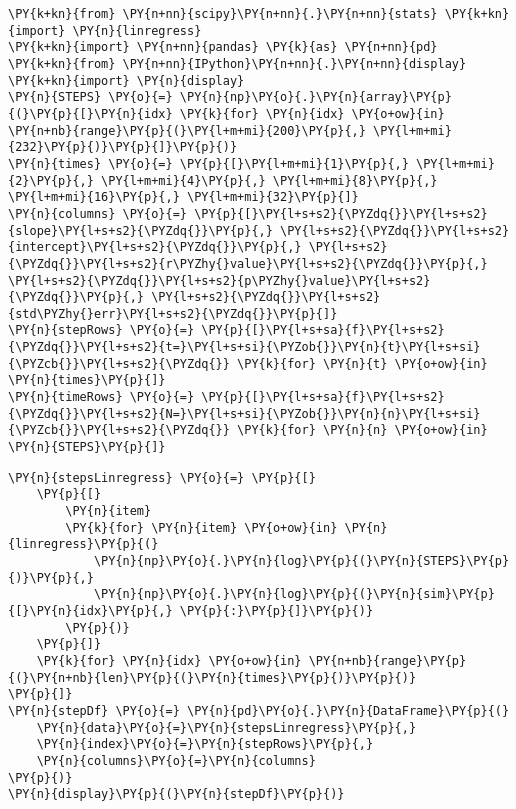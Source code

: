     \begin{tcolorbox}[breakable, size=fbox, boxrule=1pt, pad at break*=1mm,colback=cellbackground, colframe=cellborder]
\begin{Verbatim}[commandchars=\\\{\}]
\PY{k+kn}{from} \PY{n+nn}{scipy}\PY{n+nn}{.}\PY{n+nn}{stats} \PY{k+kn}{import} \PY{n}{linregress}
\PY{k+kn}{import} \PY{n+nn}{pandas} \PY{k}{as} \PY{n+nn}{pd}
\PY{k+kn}{from} \PY{n+nn}{IPython}\PY{n+nn}{.}\PY{n+nn}{display} \PY{k+kn}{import} \PY{n}{display}
\PY{n}{STEPS} \PY{o}{=} \PY{n}{np}\PY{o}{.}\PY{n}{array}\PY{p}{(}\PY{p}{[}\PY{n}{idx} \PY{k}{for} \PY{n}{idx} \PY{o+ow}{in} \PY{n+nb}{range}\PY{p}{(}\PY{l+m+mi}{200}\PY{p}{,} \PY{l+m+mi}{232}\PY{p}{)}\PY{p}{]}\PY{p}{)}
\PY{n}{times} \PY{o}{=} \PY{p}{[}\PY{l+m+mi}{1}\PY{p}{,} \PY{l+m+mi}{2}\PY{p}{,} \PY{l+m+mi}{4}\PY{p}{,} \PY{l+m+mi}{8}\PY{p}{,} \PY{l+m+mi}{16}\PY{p}{,} \PY{l+m+mi}{32}\PY{p}{]}
\PY{n}{columns} \PY{o}{=} \PY{p}{[}\PY{l+s+s2}{\PYZdq{}}\PY{l+s+s2}{slope}\PY{l+s+s2}{\PYZdq{}}\PY{p}{,} \PY{l+s+s2}{\PYZdq{}}\PY{l+s+s2}{intercept}\PY{l+s+s2}{\PYZdq{}}\PY{p}{,} \PY{l+s+s2}{\PYZdq{}}\PY{l+s+s2}{r\PYZhy{}value}\PY{l+s+s2}{\PYZdq{}}\PY{p}{,} \PY{l+s+s2}{\PYZdq{}}\PY{l+s+s2}{p\PYZhy{}value}\PY{l+s+s2}{\PYZdq{}}\PY{p}{,} \PY{l+s+s2}{\PYZdq{}}\PY{l+s+s2}{std\PYZhy{}err}\PY{l+s+s2}{\PYZdq{}}\PY{p}{]}
\PY{n}{stepRows} \PY{o}{=} \PY{p}{[}\PY{l+s+sa}{f}\PY{l+s+s2}{\PYZdq{}}\PY{l+s+s2}{t=}\PY{l+s+si}{\PYZob{}}\PY{n}{t}\PY{l+s+si}{\PYZcb{}}\PY{l+s+s2}{\PYZdq{}} \PY{k}{for} \PY{n}{t} \PY{o+ow}{in} \PY{n}{times}\PY{p}{]}
\PY{n}{timeRows} \PY{o}{=} \PY{p}{[}\PY{l+s+sa}{f}\PY{l+s+s2}{\PYZdq{}}\PY{l+s+s2}{N=}\PY{l+s+si}{\PYZob{}}\PY{n}{n}\PY{l+s+si}{\PYZcb{}}\PY{l+s+s2}{\PYZdq{}} \PY{k}{for} \PY{n}{n} \PY{o+ow}{in} \PY{n}{STEPS}\PY{p}{]}
\end{Verbatim}
\end{tcolorbox}

    \begin{tcolorbox}[breakable, size=fbox, boxrule=1pt, pad at break*=1mm,colback=cellbackground, colframe=cellborder]
\begin{Verbatim}[commandchars=\\\{\}]
\PY{n}{stepsLinregress} \PY{o}{=} \PY{p}{[}
    \PY{p}{[}
        \PY{n}{item}
        \PY{k}{for} \PY{n}{item} \PY{o+ow}{in} \PY{n}{linregress}\PY{p}{(}
            \PY{n}{np}\PY{o}{.}\PY{n}{log}\PY{p}{(}\PY{n}{STEPS}\PY{p}{)}\PY{p}{,}
            \PY{n}{np}\PY{o}{.}\PY{n}{log}\PY{p}{(}\PY{n}{sim}\PY{p}{[}\PY{n}{idx}\PY{p}{,} \PY{p}{:}\PY{p}{]}\PY{p}{)}
        \PY{p}{)}
    \PY{p}{]}
    \PY{k}{for} \PY{n}{idx} \PY{o+ow}{in} \PY{n+nb}{range}\PY{p}{(}\PY{n+nb}{len}\PY{p}{(}\PY{n}{times}\PY{p}{)}\PY{p}{)}
\PY{p}{]}
\PY{n}{stepDf} \PY{o}{=} \PY{n}{pd}\PY{o}{.}\PY{n}{DataFrame}\PY{p}{(}
    \PY{n}{data}\PY{o}{=}\PY{n}{stepsLinregress}\PY{p}{,}
    \PY{n}{index}\PY{o}{=}\PY{n}{stepRows}\PY{p}{,}
    \PY{n}{columns}\PY{o}{=}\PY{n}{columns}
\PY{p}{)}
\PY{n}{display}\PY{p}{(}\PY{n}{stepDf}\PY{p}{)}
\end{Verbatim}
\end{tcolorbox}

